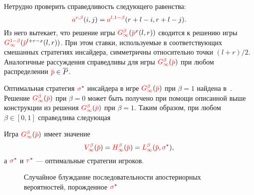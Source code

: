 {Нетрудно проверить справедливость следующего равенства:
\begin{equation*}
  \as[r](i, j) = \as[l][1-\beta](r+l-i, r+l-j).
\end{equation*}
Из него вытекает, что решение игры $\theG{\infty}(\pd^x(l, r))$ сводится к решению игры $\theG[1-\beta]{\infty}(\pd^{l+r-x}(l,r))$.
При этом ставки, используемые в соответствующих смешанных стратегиях инсайдера, симметричны относительно точки $(l+r)/2$.
Аналогичные рассуждения справедливы для игры $\theG{\infty}(\pd)$ при любом распределении $\pd \in \PM$.

Оптимальная стратегия $\textcolor{red}{\sigma}^*$ инсайдера в игре $\theG{\infty}(\pd)$ при $\beta = 1$ найдена в~\cite{domansky11}.
Решение $\theG{\infty}(\pd)$ при $\beta = 0$ может быть получено при помощи описанной выше конструкции из решения $\theG{\infty}(\pd)$ при $\beta = 1$.
Таким образом, при любом $\beta \in [0, 1]$ справедлива следующая
\begin{theorem}
  \label{ch2:solution:theorem}
  Игра $\theG{\infty}(\pd)$ имеет значение
  \[
    \V{\infty}(\pd) = \H{\infty}(\pd) = \L{\infty}(\pd, \sigmar^*),
  \]
  а $\textcolor{red}{\sigma}^*$ и $\textcolor{red}{\tau}^*$ --- оптимальные стратегии игроков.
\end{theorem}

\begin{figure}[tbh]
  \centering
  \caption[Последовательность апостериорных вероятностей]{Случайное блуждание последовательности апостериорных вероятностей, порожденное $\textcolor{red}{\sigma}^*$}
  \label{ch2:fig:posterior-1}
\end{figure}

}
